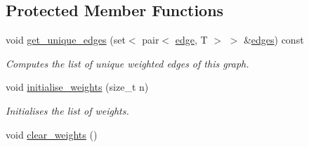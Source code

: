 \subsection*{Protected Member Functions}
\begin{DoxyCompactItemize}
\item 
void \hyperlink{classlgraph_1_1utils_1_1wugraph_a365789840be9490091e6d8de03521cad}{get\+\_\+unique\+\_\+edges} (set$<$ pair$<$ \hyperlink{namespacelgraph_1_1utils_a6510284ce1b1ae5dc97ce5d2de426e10}{edge}, T $>$ $>$ \&\hyperlink{classlgraph_1_1utils_1_1wugraph_a877370aeb266c3fbe14f6ef890bff504}{edges}) const 
\begin{DoxyCompactList}\small\item\em Computes the list of unique weighted edges of this graph. \end{DoxyCompactList}\item 
void \hyperlink{classlgraph_1_1utils_1_1wxgraph_a0b0c0b54acbc7816eb5b9958e61805cf}{initialise\+\_\+weights} (size\+\_\+t n)\hypertarget{classlgraph_1_1utils_1_1wxgraph_a0b0c0b54acbc7816eb5b9958e61805cf}{}\label{classlgraph_1_1utils_1_1wxgraph_a0b0c0b54acbc7816eb5b9958e61805cf}

\begin{DoxyCompactList}\small\item\em Initialises the list of weights. \end{DoxyCompactList}\item 
void \hyperlink{classlgraph_1_1utils_1_1wxgraph_a145f81ae3609af5ec038ace8b4413fad}{clear\+\_\+weights} ()\hypertarget{classlgraph_1_1utils_1_1wxgraph_a145f81ae3609af5ec038ace8b4413fad}{}\label{classlgraph_1_1utils_1_1wxgraph_a145f81ae3609af5ec038ace8b4413fad}


\end{DoxyCompactItemize}
